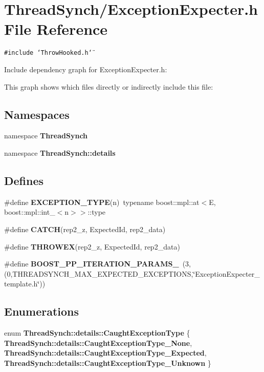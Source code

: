 \section{Thread\-Synch/Exception\-Expecter.h File Reference}
\label{_exception_expecter_8h}
{\tt \#include \char`\"{}Throw\-Hooked.h\char`\"{}}\par


Include dependency graph for Exception\-Expecter.h:

This graph shows which files directly or indirectly include this file:\subsection*{Namespaces}
\begin{CompactItemize}
\item 
namespace {\bf Thread\-Synch}
\item 
namespace {\bf Thread\-Synch::details}
\end{CompactItemize}
\subsection*{Defines}
\begin{CompactItemize}
\item 
\#define {\bf EXCEPTION\_\-TYPE}(n)~typename boost::mpl::at$<$E, boost::mpl::int\_\-$<$n$>$$>$::type
\item 
\#define {\bf CATCH}(rep2\_\-z, Expected\-Id, rep2\_\-data)
\item 
\#define {\bf THROWEX}(rep2\_\-z, Expected\-Id, rep2\_\-data)
\item 
\#define {\bf BOOST\_\-PP\_\-ITERATION\_\-PARAMS\_}~(3,(0,THREADSYNCH\_\-MAX\_\-EXPECTED\_\-EXCEPTIONS,\char`\"{}Exception\-Expecter\_\-template.h\char`\"{}))
\end{CompactItemize}
\subsection*{Enumerations}
\begin{CompactItemize}
\item 
enum {\bf Thread\-Synch::details::Caught\-Exception\-Type} \{ {\bf Thread\-Synch::details::Caught\-Exception\-Type\_\-None}, 
{\bf Thread\-Synch::details::Caught\-Exception\-Type\_\-Expected}, 
{\bf Thread\-Synch::details::Caught\-Exception\-Type\_\-Unknown}
 \}
\end{CompactItemize}


